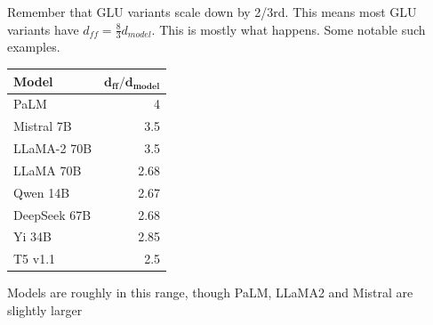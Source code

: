 \small
Remember that GLU variants scale down by 2/3rd. This means most GLU variants have $d_{ff} = \frac{8}{3} d_{model}$. This is mostly what happens. Some notable such examples.

\begin{center}
\footnotesize
\renewcommand{\arraystretch}{0.9}
\begin{tabular}{@{}lr@{}}
\toprule
\textbf{Model} & $\boldsymbol{d_{ff}/d_{model}}$\\
\midrule
PaLM & 4\\
Mistral 7B & 3.5\\
LLaMA-2 70B & 3.5\\
LLaMA 70B & 2.68\\
Qwen 14B & 2.67\\
DeepSeek 67B & 2.68\\
Yi 34B & 2.85\\
T5 v1.1 & 2.5\\
\bottomrule
\end{tabular}
\end{center}
Models are roughly in this range, though PaLM, LLaMA2 and Mistral are slightly larger
